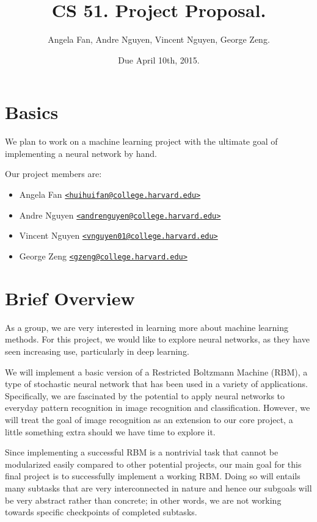 \documentclass[12pt]{article}
\begin{document}
\title{CS 51. Project Proposal.}
\date{Due April 10th, 2015.}
\author{Angela Fan, Andre Nguyen, Vincent Nguyen, George Zeng.}
\maketitle

\section{Basics}
We plan to work on a machine learning project with the ultimate goal of implementing a neural network by hand.

Our project members are:
\begin{itemize}
  \item Angela Fan \href{mailto:huihuifan@college.harvard.edu}
    {\nolinkurl{<huihuifan@college.harvard.edu>}}
  \item Andre Nguyen \href{mailto:andrenguyen@college.harvard.edu}
    {\nolinkurl{<andrenguyen@college.harvard.edu>}}
  \item Vincent Nguyen \href{mailto:vnguyen01@college.harvard.edu}
    {\nolinkurl{<vnguyen01@college.harvard.edu>}}
  \item George Zeng \href{mailto:gzeng@college.harvard.edu}
    {\nolinkurl{<gzeng@college.harvard.edu>}}
\end{itemize}

\section{Brief Overview}
As a group, we are very interested in learning more about machine learning methods. For this project, we would like to explore neural networks, as they have seen increasing use, particularly in deep learning.

We will implement a basic version of a Restricted Boltzmann Machine (RBM), a type of stochastic neural network that has been used in a variety of applications. Specifically, we are fascinated by the potential to apply neural networks to everyday pattern recognition in image recognition and classification. However, we will treat the goal of image recognition as an extension to our core project, a little something extra should we have time to explore it. 

Since implementing a successful RBM is a nontrivial task that cannot be modularized easily compared to other potential projects, our main goal for this final project is to successfully implement a working RBM. Doing so will entails many subtasks that are very interconnected in nature and hence our subgoals will be very abstract rather than concrete; in other words, we are not working towards specific checkpoints of completed subtasks. 
\end{document}
